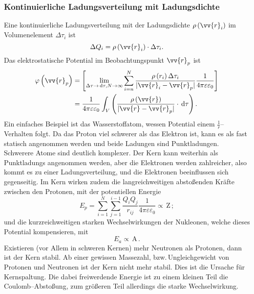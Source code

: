 \documentclass[a4paper,12pt]{article}
\newcommand{\td}{\,\text{d}}
\begin{document}
\subsubsection{Kontinuierliche Ladungsverteilung mit Ladungsdichte}
Eine kontinuierliche Ladungsverteilung mit der Ladungsdichte $\rho \left(\vv{r}_i\right)$ im Volumenelement $\Delta \tau _i$ ist
\[ 
        \Delta Q_i=\rho \left(\vv{r}_i\right)\cdot \Delta \tau _i
.\] 
Das elektrostatische Potential im Beobachtungspunkt $\vv{r}_p$ ist
\begin{align*}
        \varphi \left(\vv{r}_p\right)&=\left[\lim_{\Delta \tau \rightarrow \td \tau ,N\rightarrow \infty}\sum_{i=n}^{N}\dfrac{\rho \left(r_i\right)\Delta \tau _i}{|\vv{r}_i-\vv{r}_p|}\dfrac{1}{4\pi \varepsilon \varepsilon _0}\right]\\
                                     &=\dfrac{1}{4\pi \varepsilon \varepsilon _0}\int_{V}^{}\left(\dfrac{\rho \left(\vv{r}\right)}{|\vv{r}-\vv{r}_p|}\cdot \td \tau \right)
.\end{align*}
Ein einfaches Beispiel ist das Wasserstoffatom, wessen Potential einem $\tfrac{1}{r}$--Verhalten folgt. Da das Proton viel schwerer als das Elektron ist, kann es als fast statisch angenommen werden und beide Ladungen sind Punktladungen. Schwerere Atome sind deutlich komplexer. Der Kern kann weiterhin als Punktladungs angenommen werden, aber die Elektronen werden zahlreicher, also kommt es zu einer Ladungsverteilung, und die Elektronen beeinflussen sich gegenseitig. Im Kern wirken zudem die langreichweitigen abstoßenden Kräfte zwischen den Protonen, mit der potentiellen Energie
\[ 
        E_p=\sum_{i=1}^{N}\sum_{j=1}^{i-1}\dfrac{Q_iQ_j}{r_{ij}}\dfrac{1}{4\pi \varepsilon \varepsilon _0}\propto \,\text{Z}\,
;\] und die kurzreichweitigen starken Wechselwirkungen der Nukleonen, welche dieses Potential kompensieren, mit
\[ 
        E_a\propto \,\text{A}\,
.\] 
Existieren (vor Allem in schweren Kernen) mehr Neutronen als Protonen, dann ist der Kern stabil. Ab einer gewissen Massezahl, bzw.\,Ungleichgewicht von Protonen und Neutronen ist der Kern nicht mehr stabil. Dies ist die Ursache für Kernspaltung. Die dabei freiwerdende Energie ist zu einem kleinen Teil die Coulomb--Abstoßung, zum größeren Teil allerdings die starke Wechselwirkung.
\end{document}
